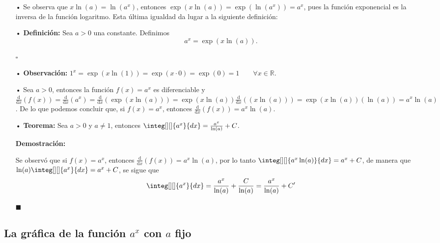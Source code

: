 \documentclass[pts12]{article}
\numberwithin{equation}{section}
\newcommand{\Col}{\color{ProcessBlue}}
\newcommand{\derivate}[2]{\frac{\mathrm{d}}{\mathrm{d}#1} \left(  {#2}  \right)  }
\newcommand{\paratodoxen}[2]{\quad \forall {#1}\in\mathbb{#2}}
\begin{document}
\begin{itemize}
\item[\Col •] Se observa que $x\ln(a)=\ln(a^x)$, entonces $\exp(x\ln(a))=\exp(\ln(a^x))=a^x$, pues la función exponencial es la inversa de la función logaritmo. Esta última igualdad da lugar a la siguiente definición:

\item[\Col •] \textbf{Definición:} Sea $a>0$ una constante. Definimos 
$$a^x=\exp(x\ln(a)).$$

\begin{flushright}
$\square$
\end{flushright}

\item[\Col •] \textbf{Observación:} $1^x=\exp(x\ln(1))=\exp(x\cdot 0)=\exp(0)=1 \quad \paratodoxen{x}{R}$.
 
\item[\Col •] Sea $a>0$, entonces la función $f(x)=a^x$ es diferenciable y $\derivate{x}{f(x)}=\derivate{x}{a^x}=\derivate{x}{\exp(x\ln(a))}=\exp(x\ln(a))\derivate{x}{(x\ln(a))}=\exp(x\ln(a))(\ln(a))=a^x\ln(a)$. De lo que podemos concluir que, si $f(x)=a^x$, entonces $\derivate{x}{f(x)}=a^x\ln(a)$.

\item[\Col •] \textbf{Teorema:} Sea $a>0$ y $a\neq 1$, entonces $\integ[][]{a^x}{dx}=\frac{a^x}{\ln(a)}+C$.

\textbf{Demostración:}

Se observó que si $f(x)=a^x$, entonces $\derivate{x}{f(x)}=a^x\ln(a)$, por lo tanto $\integ[][]{a^x\ln(a)}{dx}=a^x+C$, de manera que $\ln(a)\integ[][]{a^x}{dx}=a^x+C$, se sigue que 
$$\integ[][]{a^x}{dx}=\frac{a^x}{\ln(a)}+\frac{C}{\ln(a)}=\frac{a^x}{\ln(a)}+C'$$  

\begin{flushright}
$\blacksquare$
\end{flushright} 

\end{itemize}

\subsection{\Col La gráfica de la función $a^x$ con $a$ fijo}
\end{document}
